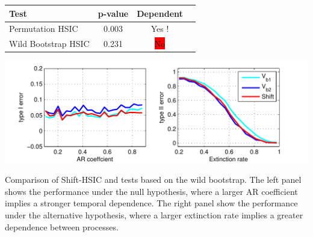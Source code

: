 \documentclass[landscape,a0]{a0poster_csml_v2}
\begin{document}
\begin{poster}
\begin{PosterColumn}
\begin{minipage}[c]{0.6\textwidth}
\begin{minipage}[c]{0.45\textwidth}
\end{minipage} 
\begin{center}
\vspace{4cm}
\begin{tabular}{ l | c | c| c }
  \hline                       
  Test                   & p-value& Dependent   \\  
    \hline   
  Permutation HSIC       & 0.003  & Yes ! \\
    \hline   
  Wild Bootstrap HSIC    & 0.231  & \colorbox{red}{No} \\
  \hline  
\end{tabular}
\end{center}
\end{minipage}

\vspace{1cm}

\begin{minipage}[c]{0.6\textwidth}
\includegraphics[width=\textwidth]{../img/arExtinct.pdf} 
\end{minipage}
\begin{minipage}[c]{0.4\textwidth}
Comparison of Shift-HSIC \cite{chwialkowski2014kernel}  and tests based on the wild bootstrap. The left panel shows the performance under the null hypothesis, where a larger AR coefficient implies a stronger temporal dependence. The right panel show the performance under the alternative hypothesis, where a larger extinction rate implies a greater dependence between processes.
\end{minipage}




\end{PosterColumn}
\end{poster}
\end{document}
